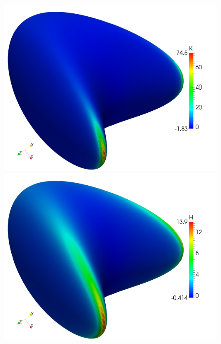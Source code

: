   \begin{figure}
    \begin{minipage}[t]{0.49\textwidth}
       \centering\includegraphics[width=\textwidth]{bilder/Curvature/heineB/K250k.png}
    \end{minipage}\hfill
    \begin{minipage}[t]{0.49\textwidth}
       \centering\includegraphics[width=\textwidth]{bilder/Curvature/heineB/H250k.png}
    \end{minipage}\\
    \begin{minipage}[t]{0.49\textwidth}

\end{minipage}
\end{figure}
